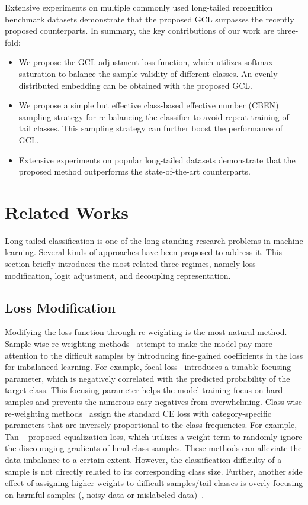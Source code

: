 \documentclass[10pt,twocolumn,letterpaper]{article}
\begin{document}
Extensive experiments on multiple commonly used long-tailed recognition benchmark datasets demonstrate that the proposed GCL surpasses the recently proposed counterparts. In summary, the key contributions of our work are three-fold:
\begin{itemize}
    \item We propose the GCL adjustment loss function, which utilizes softmax saturation to balance the sample validity of different classes. An evenly distributed embedding can be obtained with the proposed GCL.
    \item We propose a simple but effective class-based effective number (CBEN) sampling strategy for re-balancing the classifier to avoid repeat training of tail classes. This sampling strategy can further boost the performance of GCL.
    \item Extensive experiments on popular long-tailed datasets demonstrate that the proposed method outperforms the state-of-the-art counterparts.
\end{itemize}



\section{Related Works}
\label{sec:related_works}
Long-tailed classification is one of the long-standing research problems in machine learning. Several kinds of approaches have been proposed to address it. This section briefly introduces the most related three regimes, namely loss modification, logit adjustment, and decoupling representation.
\subsection{Loss Modification}
Modifying the loss function through re-weighting is the most natural method. Sample-wise re-weighting methods~\cite{Mengye2018Learning, Tsung2020Focal} attempt to make the model pay more attention to the difficult samples by introducing fine-gained coefficients in the loss for imbalanced learning. For example, focal loss~\cite{Tsung2020Focal} introduces a tunable focusing parameter, which is negatively correlated with the predicted probability of the target class. This focusing parameter helps the model training focus on hard samples and prevents the numerous easy negatives from overwhelming. Class-wise re-weighting methods~\cite{Huang2016CVPR, Salman2018Cost, cui2019class, tan2020Equalization} assign the standard CE loss with category-specific parameters that are inversely proportional to the class frequencies. For example, Tan \etal~\cite{tan2020Equalization} proposed equalization loss, which utilizes a weight term to randomly ignore the discouraging gradients of head class samples. These methods can alleviate the data imbalance to a certain extent. However, the classification difficulty of a sample is not directly related to its corresponding class size. Further, another side effect of assigning higher weights to difficult samples/tail classes is overly focusing on harmful samples (\eg, noisy data or mislabeled data)~\cite{Pang2017Understanding}.
\end{document}
